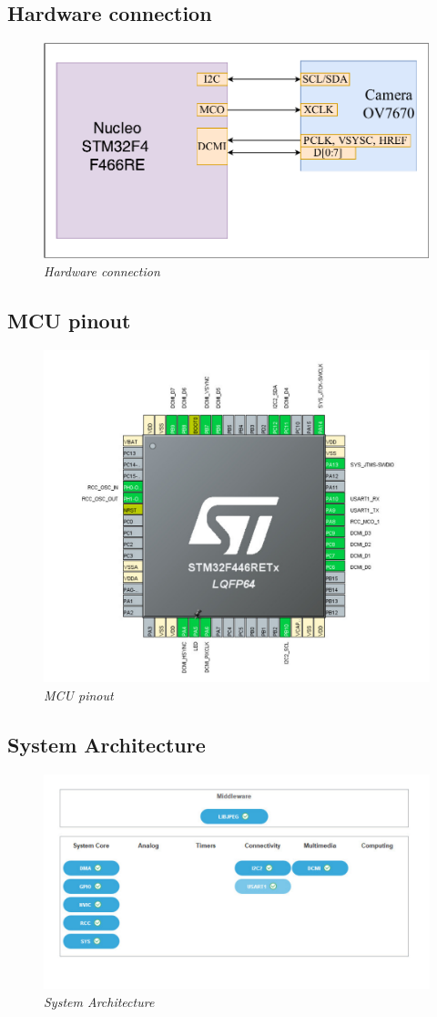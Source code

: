 \documentclass[D:/Latex/Internship/Report/Latex/Report.tex]{subfiles}
\begin{document}
			\subsection{Hardware connection}
			\begin{figure}[ht!]
			\centering
			\includegraphics[width = 0.8\linewidth]{Figure/Hardware_connection.pdf}
			\caption{\it Hardware connection}
			\end{figure}			
			\subsection{MCU pinout} 
				\begin{figure}[ht!]
					\centering
					\includegraphics[width = 0.8\linewidth]{Figure/MCU_pinout.pdf}
					\caption{\it MCU pinout}
				\end{figure}
				\newpage
			\subsection{System Architecture}
				\begin{figure}[ht!]
					\centering
					\includegraphics[width = 0.8\linewidth]{Figure/System_Architecture.pdf}
					\caption{\it System Architecture}
				\end{figure}
\end{document}
